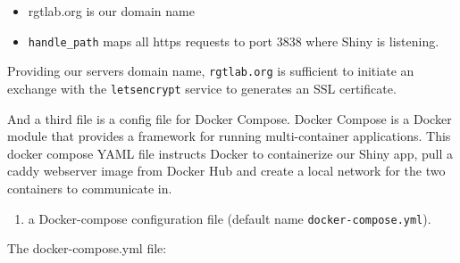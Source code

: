 \documentclass[
  letterpaper,
  DIV=11,
  numbers=noendperiod,
  oneside]{scrartcl}
\providecommand{\tightlist}{%
  \setlength{\itemsep}{0pt}\setlength{\parskip}{0pt}}\usepackage{longtable,booktabs,array}
\begin{document}
\begin{itemize}
\tightlist
\item
  rgtlab.org is our domain name
\item
  \texttt{handle\_path} maps all https requests to port 3838 where Shiny
  is listening.
\end{itemize}

Providing our servers domain name, \texttt{rgtlab.org} is sufficient to
initiate an exchange with the \texttt{letsencrypt} service to generates
an SSL certificate.

And a third file is a config file for Docker Compose. Docker Compose is
a Docker module that provides a framework for running multi-container
applications. This docker compose YAML file instructs Docker to
containerize our Shiny app, pull a caddy webserver image from Docker Hub
and create a local network for the two containers to communicate in.

\begin{enumerate}
\def\labelenumi{\arabic{enumi}.}
\setcounter{enumi}{2}
\tightlist
\item
  a Docker-compose configuration file (default name
  \texttt{docker-compose.yml}).
\end{enumerate}

The docker-compose.yml file:
\end{document}
